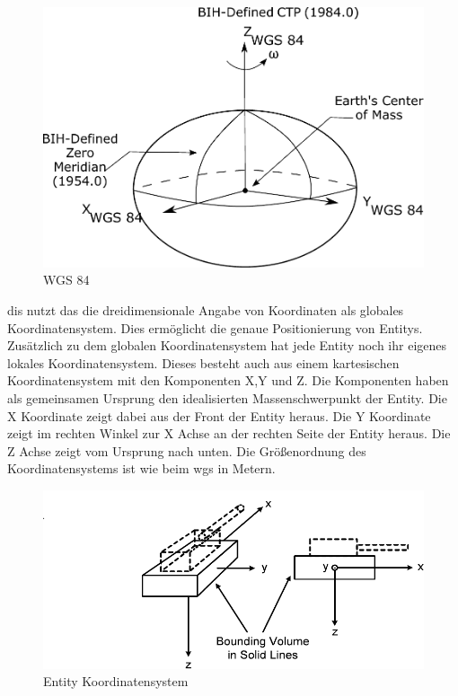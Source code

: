 \begin{figure}[H]
	\centering
	\includegraphics[scale=0.5]{bilder/wgs84.pdf}
	\caption{WGS 84 \cite{DefenseMappingAgency.}}
	\label{img:wgs84}
\end{figure}
\ac{dis} nutzt das die dreidimensionale Angabe von Koordinaten als globales Koordinatensystem. Dies ermöglicht die genaue Positionierung von Entitys. Zusätzlich zu dem globalen Koordinatensystem hat jede Entity noch ihr eigenes lokales Koordinatensystem. Dieses besteht auch aus einem kartesischen Koordinatensystem mit den Komponenten X,Y und Z. Die Komponenten haben als gemeinsamen Ursprung den idealisierten Massenschwerpunkt der Entity.  
Die X Koordinate zeigt dabei aus der Front der Entity heraus. Die Y Koordinate zeigt im rechten Winkel zur X Achse an der rechten Seite der Entity heraus. Die Z Achse zeigt vom Ursprung nach unten. Die Größenordnung des Koordinatensystems ist wie beim \ac{wgs} in Metern. 
\begin{figure}[H]
	\centering
	\includegraphics[scale=0.7]{bilder/entity_koordinaten.pdf}
	\caption{Entity Koordinatensystem \cite{SISOStandardsActivityCommitteeoftheIEEEComputerSociety.}}
	\label{img:wgs84}
\end{figure}


